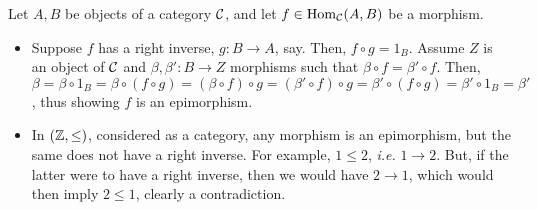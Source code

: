 \begin{xca}
Let $A, B$ be objects of a category $\mathcal{C}$, and let $f \in \operatorname{Hom}_{\mathcal{C}}(A,
B)$ be a morphism.
\begin{itemize}
    \item Suppose $f$ has a right inverse, $g: B \to A$, say. Then, $f \circ g
    = 1_B$. Assume $Z$ is an object of $\mathcal{C}$ and $\beta, \beta': B \to Z$
    morphisms such that $\beta \circ f = \beta' \circ f$. Then, $\beta = \beta
    \circ 1_B = \beta \circ (f \circ g) = (\beta \circ f) \circ g = (\beta'
    \circ f) \circ g = \beta' \circ (f \circ g) = \beta' \circ 1_B = \beta'$,
    thus showing $f$ is an epimorphism.
    \item In $(\mathbb{Z}, \le)$, considered as a category, any morphism is an
    epimorphism, but the same does not have a right inverse. For example, $1 \le
    2$, \emph{i.e.} $1 \to 2$. But, if the latter were to have a right inverse,
    then we would have $2 \to 1$, which would then imply $2 \le 1$, clearly a
    contradiction.
\end{itemize}
\end{xca}
